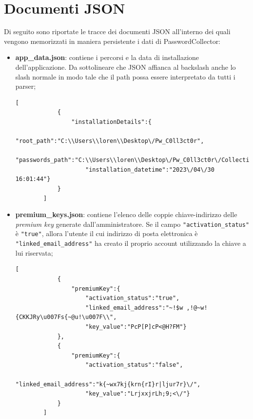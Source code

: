 \documentclass[a4paper, 12pt, one column, aas_macros]{article}
\begin{document}
	\section{Documenti JSON}
	Di seguito sono riportate le tracce dei documenti JSON all'interno dei quali vengono memorizzati in maniera persistente i dati di PasswordCollector:
	\begin{itemize}
		\item \textbf{app\_data.json}: contiene i percorsi e la data di installazione dell'applicazione. Da sottolineare che JSON affianca al backslash anche lo slash normale in modo tale che il path possa essere interpretato da tutti i parser;
		\begin{Verbatim}[tabsize=1]
		[
			{
				"installationDetails":{
					"root_path":"C:\\Users\\loren\\Desktop\/Pw_C0ll3ct0r",
					"passwords_path":"C:\\Users\\loren\\Desktop\/Pw_C0ll3ct0r\/Collections",
					"installation_datetime":"2023\/04\/30 16:01:44"}
			}
		]
		\end{Verbatim}
	
		\item \textbf{premium\_keys.json}: contiene l'elenco delle coppie chiave-indirizzo delle \textit{premium key} generate dall'amministratore. Se il campo \verb|"activation_status"| è \verb|"true"|, allora l'utente il cui indirizzo di posta elettronica è \verb|"linked_email_address"| ha creato il proprio account utilizzando la chiave a lui riservata;
		\begin{Verbatim}[tabsize=1]
		[
			{
				"premiumKey":{
					"activation_status":"true",
					"linked_email_address":"~!$w ,!@~w! {CKKJRy\u007Fs{~@u!\u007F\\",
					"key_value":"PcP[P]cP<@H?FM"}
			},
			{
				"premiumKey":{
					"activation_status":"false",
					"linked_email_address":"k{~wx7kj{krn{rI}r|ljur7r}\/",
					"key_value":"LrjxxjrLh;9;<\/"}
			}
		]
		\end{Verbatim}
	

\end{itemize}
\end{document}

